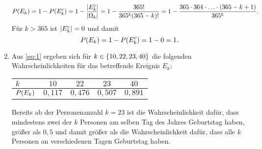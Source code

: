 \documentclass{exercise}
\begin{document}
\begin{enumerate}
\begin{equation}
            P\parentheses*{E_k} = 1 - P\parentheses*{E_k^c} = 1 - \frac{\absolute*{E_k^c}}{\absolute*{\Omega_k}} = 1 - \frac{365!}{365^k\parentheses*{365 - k}!} = 1 - \frac{365 \cdot 364 \cdot \ldots \cdot \parentheses*{365 - k + 1}}{365^k}.
        \end{equation}
        Für \(k > 365\) ist \(\absolute*{E_k^c} = 0\) und damit
        \[
            P\parentheses*{E_k} = 1 - P\parentheses*{E_k^c} = 1 - 0 = 1.
        \]
        \item Aus \eqref{eq:1} ergeben sich für \(k \in \braces*{10, 22, 23, 40}\) die folgenden Wahrscheinlichkeiten für das betreffende Ereignis \(E_k\):
        \begin{center}
            \begin{tabular}{lcccc}
                \toprule
                \(k\) & \(10\) & \(22\) & \(23\) & \(40\)\\
                \midrule
                \(P\parentheses*{E_k}\) & \(0,117\) & \(0,476\) & \(0,507\) & \(0,891\)\\
                \bottomrule
            \end{tabular}
        \end{center}
        Bereits ab der Personenanzahl \(k = 23\) ist die Wahrscheinlichkeit dafür, dass mindestens zwei der \(k\) Personen am selben Tag des Jahres Geburtstag haben, größer als \(0,5\) und damit größer als die Wahrscheinlichkeit dafür, dass alle \(k\) Personen an verschiedenen Tagen Geburtstag haben.
    \end{enumerate}
\end{document}
